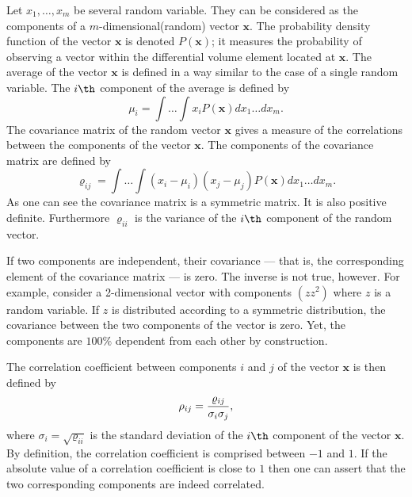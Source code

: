 Let $x_1,\ldots,x_m$ be several random variable. They can be
considered as the components of a $m$-dimensional(random) vector
$\textbf{x}$. The probability density function of the vector $\textbf{
x}$ is denoted $P\left(\textbf{x}\right)$; it measures the
probability of observing a vector within the differential volume
element located at $\textbf{x}$. The average of the vector $\textbf{x}$
is defined in a way similar to the case of a single random
variable. The $i\th$ component of the average is defined by
\begin{equation}
 \mu_i=\int\ldots\int x_i P\left(\textbf{x}\right)dx_1\ldots dx_m.
\end{equation}
The covariance matrix of the random vector $\textbf{x}$ gives a
measure of the correlations between the components of the vector
$\textbf{x}$. The components of the covariance matrix are defined by
\begin{equation}
 \varrho_{ij}=\int\ldots\int \left(x_i-\mu_i\right)\left(x_j-\mu_j\right)
  P\left(\textbf{x}\right)dx_1\ldots dx_m.
\end{equation}
As one can see the covariance matrix is a symmetric matrix. It is
also positive definite. Furthermore $\varrho_{ii}$ is the variance
of the $i\th$ component of the random vector.


If two components are independent, their covariance --- that is,
the corresponding element of the covariance matrix --- is zero.
The inverse is not true, however. For example, consider a
2-dimensional vector with components $\left(z z^2\right)$ where
$z$ is a random variable. If $z$ is distributed according to a
symmetric distribution, the covariance between the two components
of the vector is zero. Yet, the components are $100\%$ dependent
from each other by construction.

The correlation coefficient between components $i$ and $j$ of the
vector $\textbf{x}$ is then defined by
\begin{equation}
 \rho_{ij}={\varrho_{ij}\over \sigma_i \sigma_j},
\end{equation}
where $\sigma_i=\sqrt{\varrho_{ii}}$ is the standard deviation of
the $i\th$ component of the vector $\textbf{x}$. By definition, the
correlation coefficient is comprised between $-1$ and $1$. If the
absolute value of a correlation coefficient is close to $1$ then
one can assert that the two corresponding components are indeed
correlated.

